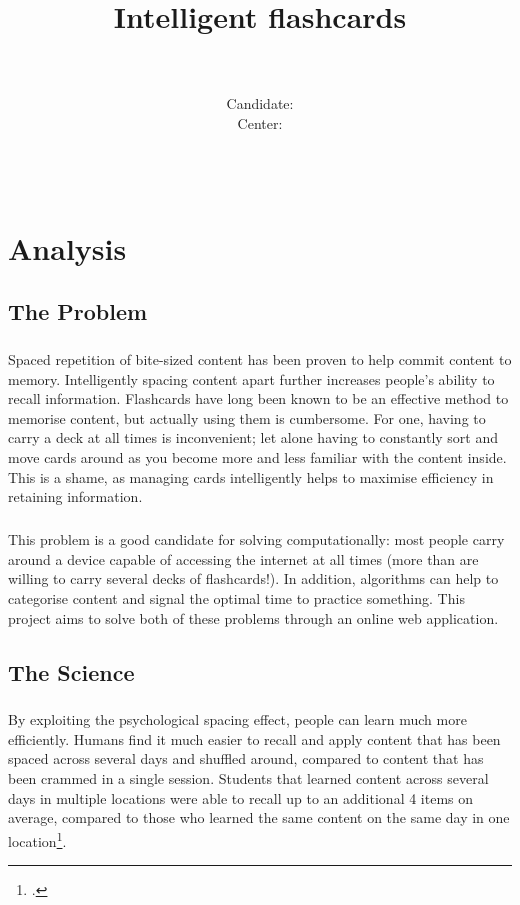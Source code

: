 \documentclass{report}
\title{Intelligent flashcards}
\author {
  \candidatename \\\\
  Candidate: \candidatenumber \\
  Center: \centernumber \\
  \centername \\\\
  \qualification
}
\begin{document}
\maketitle
\setcounter{page}{2}
\tableofcontents

\chapter{Analysis}
\section{The Problem}
\paragraph{}
Spaced repetition of bite-sized content has been proven to help commit content to memory. Intelligently spacing content apart further increases people's ability to recall information. Flashcards have long been known to be an effective method to memorise content, but actually using them is cumbersome. For one, having to carry a deck at all times is inconvenient; let alone having to constantly sort and move cards around as you become more and less familiar with the content inside. This is a shame, as managing cards intelligently helps to maximise efficiency in retaining information. 

\paragraph{}
This problem is a good candidate for solving computationally: most people carry around a device capable of accessing the internet at all times (more than are willing to carry several decks of flashcards!). In addition, algorithms can help to categorise content and signal the optimal time to practice something. This project aims to solve both of these problems through an online web application.

\section{The Science}
\paragraph{}
By exploiting the psychological spacing effect, people can learn much more efficiently. Humans find it much easier to recall and apply content that has been spaced across several days and shuffled around, compared to content that has been crammed in a single session. Students that learned content across several days in multiple locations were able to recall up to an additional 4 items on average, compared to those who learned the same content on the same day in one location\footcite{ShufflingMathematicsProblems}.
\end{document}
